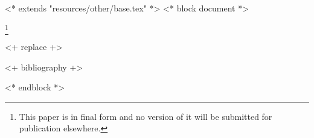 <* extends "resources/other/base.tex" *>
<* block document *>
\subjclass[2010]{\docclasses}
\keywords{\dockeywords}



\title[\shorttitlename]{\titlename}
\author{<+ user.name +>}
\address{<+ user.institution +>, <+ user.address +>}
\thanks{This paper is in final form and no version of it will be submitted for publication elsewhere.}

\begin{abstract}
    <+ replace +>
\end{abstract}

\maketitle
\tableofcontents

<+ replace +>

<+ bibliography +>


<* endblock *>

